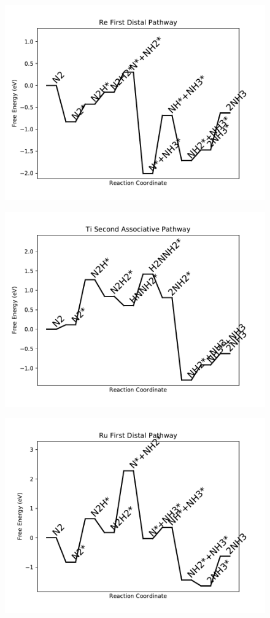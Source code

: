 \begin{figure}
\includegraphics[width=0.8\linewidth]{data/plots/Re_distal_1.pdf}
\end{figure}

\begin{figure}
\includegraphics[width=0.8\linewidth]{data/plots/Ti_associative_2.pdf}
\end{figure}

\begin{figure}
\includegraphics[width=0.8\linewidth]{data/plots/Ru_distal_1.pdf}
\end{figure}

